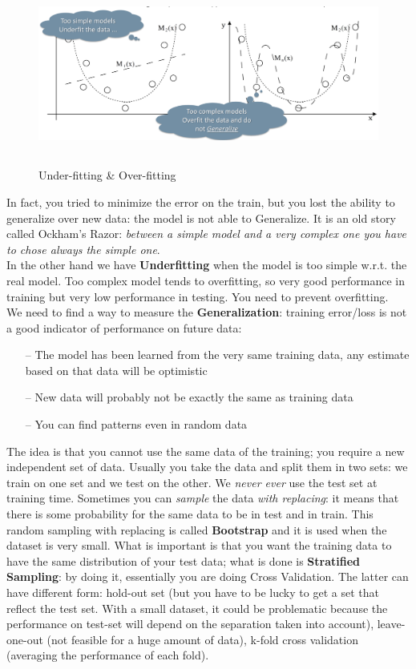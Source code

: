  \begin{figure}[h]
    \centering
    \includegraphics[width=15cm, height=6cm]{images/model_complexity.png}
    \caption{Under-fitting \& Over-fitting}
    \label{fig:model_complexity}
\end{figure}

 In fact, you tried to minimize the error on the train, but you lost the ability to generalize over new data: the model is not able to Generalize. It is an old story called Ockham's Razor: \textit{between a simple model and a very complex one you have to chose always the simple one}.\\
 In the other hand we have \textbf{Underfitting} when the model is too simple w.r.t. the real model. Too complex model tends to overfitting, so very good performance in training but very low performance in testing. You need to prevent overfitting.\\
 We need to find a way to measure the \textbf{Generalization}: training error/loss is not a good indicator of performance on future data:
 \begin{itemize}
     \item[--] The model has been learned from the very same training data, any estimate based on that data will be optimistic
     \item[--] New data will probably not be exactly the same as training data
    \item[--] You can find patterns even in random data
 \end{itemize}{}
 
 The idea is that you cannot use the same data of the training; you require a new independent set of data. Usually you take the data and split them in two sets: we train on one set and we test on the other. We \textit{never ever} use the test set at training time. Sometimes you can \textit{sample} the data \textit{with replacing}: it means that there is some probability for the same data to be in test and in train. This random sampling with replacing is called \textbf{Bootstrap} and it is used when the dataset is very small. What is important is that you want the training data to have the same distribution of your test data; what is done is \textbf{Stratified Sampling}: by doing it, essentially you are doing Cross Validation. The latter can have different form: hold-out set (but you have to be lucky to get a set that reflect the test set. With a small dataset, it could be problematic because the performance on test-set will depend on the separation taken into account), leave-one-out (not feasible for a huge amount of data), k-fold cross validation (averaging the performance of each fold).
 
